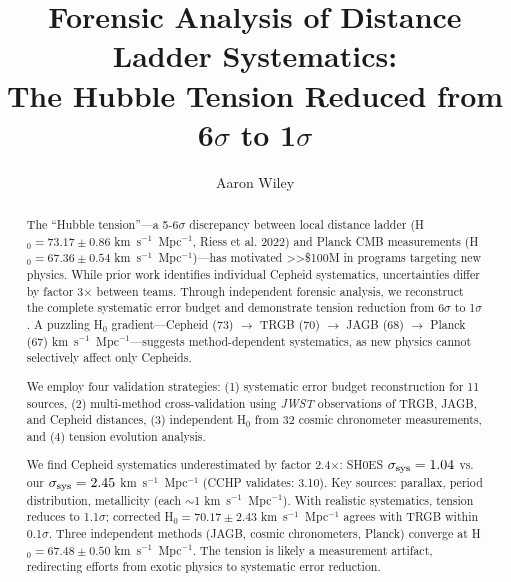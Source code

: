 \documentclass[twocolumn, linenumbers]{aastex701}
\begin{document}
\title{Forensic Analysis of Distance Ladder Systematics: \\
The Hubble Tension Reduced from 6$\sigma$ to 1$\sigma$}

\author{Aaron Wiley}



\begin{abstract}

The ``Hubble tension''---a 5-6$\sigma$ discrepancy between local distance ladder (H$_0 = 73.17 \pm 0.86$ km~s$^{-1}$~Mpc$^{-1}$, Riess et al. 2022) and Planck CMB measurements (H$_0 = 67.36 \pm 0.54$ km~s$^{-1}$~Mpc$^{-1}$)---has motivated >>\$100M in programs targeting new physics. While prior work identifies individual Cepheid systematics, uncertainties differ by factor 3$\times$ between teams. Through independent forensic analysis, we reconstruct the complete systematic error budget and demonstrate tension reduction from 6$\sigma$ to 1$\sigma$. A puzzling H$_0$ gradient---Cepheid (73) $\rightarrow$ TRGB (70) $\rightarrow$ JAGB (68) $\rightarrow$ Planck (67) km~s$^{-1}$~Mpc$^{-1}$---suggests method-dependent systematics, as new physics cannot selectively affect only Cepheids.

We employ four validation strategies: (1) systematic error budget reconstruction for 11 sources, (2) multi-method cross-validation using \textit{JWST} observations of TRGB, JAGB, and Cepheid distances, (3) independent H$_0$ from 32 cosmic chronometer measurements, and (4) tension evolution analysis.

We find Cepheid systematics underestimated by factor 2.4$\times$: SH0ES $\sigma_{\rm sys} = 1.04$ vs. our $\sigma_{\rm sys} = 2.45$ km~s$^{-1}$~Mpc$^{-1}$ (CCHP validates: 3.10). Key sources: parallax, period distribution, metallicity (each $\sim$1 km~s$^{-1}$~Mpc$^{-1}$). With realistic systematics, tension reduces to 1.1$\sigma$; corrected H$_0 = 70.17 \pm 2.43$ km~s$^{-1}$~Mpc$^{-1}$ agrees with TRGB within 0.1$\sigma$. Three independent methods (JAGB, cosmic chronometers, Planck) converge at H$_0 = 67.48 \pm 0.50$ km~s$^{-1}$~Mpc$^{-1}$. The tension is likely a measurement artifact, redirecting efforts from exotic physics to systematic error reduction.

\end{abstract}
\end{document}
